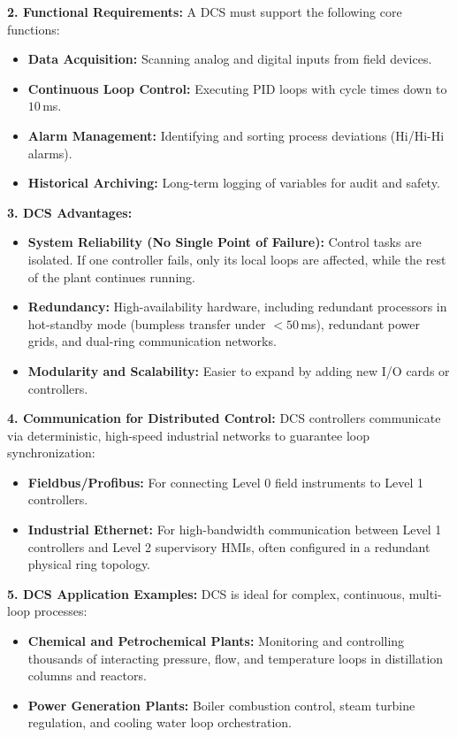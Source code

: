\documentclass[12pt,a4paper]{article}
\begin{document}
\textbf{2. Functional Requirements:}
A DCS must support the following core functions:
\begin{itemize}[leftmargin=*, itemsep=2pt]
  \item \textbf{Data Acquisition:} Scanning analog and digital inputs from field devices.
  \item \textbf{Continuous Loop Control:} Executing PID loops with cycle times down to $10\,$ms.
  \item \textbf{Alarm Management:} Identifying and sorting process deviations (Hi/Hi-Hi alarms).
  \item \textbf{Historical Archiving:} Long-term logging of variables for audit and safety.
\end{itemize}

\textbf{3. DCS Advantages:}
\begin{itemize}[leftmargin=*, itemsep=2pt]
  \item \textbf{System Reliability (No Single Point of Failure):} Control tasks are isolated. If one controller fails, only its local loops are affected, while the rest of the plant continues running.
  \item \textbf{Redundancy:} High-availability hardware, including redundant processors in hot-standby mode (bumpless transfer under $< 50\,$ms), redundant power grids, and dual-ring communication networks.
  \item \textbf{Modularity and Scalability:} Easier to expand by adding new I/O cards or controllers.
\end{itemize}

\textbf{4. Communication for Distributed Control:}
DCS controllers communicate via deterministic, high-speed industrial networks to guarantee loop synchronization:
\begin{itemize}[leftmargin=*, itemsep=2pt]
  \item \textbf{Fieldbus/Profibus:} For connecting Level 0 field instruments to Level 1 controllers.
  \item \textbf{Industrial Ethernet:} For high-bandwidth communication between Level 1 controllers and Level 2 supervisory HMIs, often configured in a redundant physical ring topology.
\end{itemize}

\textbf{5. DCS Application Examples:}
DCS is ideal for complex, continuous, multi-loop processes:
\begin{itemize}[leftmargin=*, itemsep=2pt]
  \item \textbf{Chemical and Petrochemical Plants:} Monitoring and controlling thousands of interacting pressure, flow, and temperature loops in distillation columns and reactors.
  \item \textbf{Power Generation Plants:} Boiler combustion control, steam turbine regulation, and cooling water loop orchestration.
\end{itemize}
\end{document}
